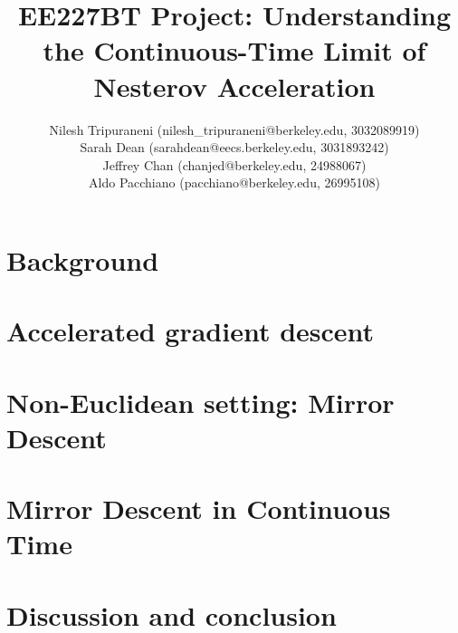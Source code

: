 \documentclass{article}
\title{EE227BT Project:
Understanding the Continuous-Time Limit of Nesterov Acceleration}
\author{Nilesh Tripuraneni (nilesh\_tripuraneni@berkeley.edu, 3032089919)\\ Sarah Dean (sarahdean@eecs.berkeley.edu, 3031893242)\\ Jeffrey Chan (chanjed@berkeley.edu, 24988067)\\ Aldo Pacchiano (pacchiano@berkeley.edu, 26995108)}
\begin{document}
\maketitle 

\section{Background}




\section{Accelerated gradient descent }




\section{Non-Euclidean setting: Mirror Descent}




\section{Mirror Descent in Continuous Time}


\section{Discussion and conclusion}





\end{document}
